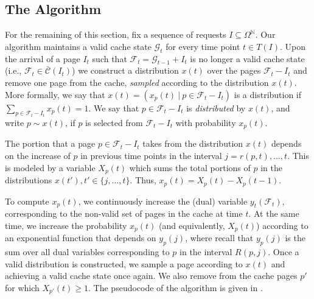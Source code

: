 \documentclass[11pt]{article}
\newcommand{\cG}{{\mathcal{G}}}
\newcommand{\cF}{{\mathcal{F}}}
\newcommand{\cC}{{\mathcal{C}}}
\newcommand{\om}{{\Omega}}
\newcommand{\bbc}{{\bar{\cC}(I_t)}}
\begin{document}
{\subsection{The Algorithm}

For the remaining of this section, fix a sequence of requests $I \subseteq \om^{\mathbb{N}}$. Our algorithm maintains a valid cache state $\cG_t$ for every time point $t \in T(I)$. Upon the arrival of a page $I_t$ such that $\cF_t = \cG_{t-1}+I_t$ is no longer a valid cache state (i.e., $\cF_t \in \bbc$) we construct a distribution $x(t)$ over the pages $\cF_t-I_t$ and remove one page from the cache, {\em sampled} according to the distribution $x(t)$. More formally, we say that $x(t) = \left( x_p(t)~|~p \in \cF_t-I_t\right)$ is a distribution if $\sum_{p \in \cF_t-I_t} x_p(t) = 1$. We say that $p \in \cF_t-I_t$ is {\em distributed} by $x(t)$, and write $p \sim x(t)$, if $p$ is selected from $\cF_t-I_t$ with probability $x_p(t)$. 

The portion that a page $p \in \cF_t-I_t$ takes from the distribution $x(t)$ depends on the increase of $p$ in previous time points in the interval $j = r(p,t),\ldots,t$. This is modeled by a variable $X_p(t)$ which sums the total portions of $p$ in the distributions $x(t'), t' \in \{j,\ldots,t\}$. Thus, $x_p(t) = X_p(t)-X_p(t-1)$.

To compute $x_p(t)$, we continuously increase the (dual) variable $y_t(\cF_t)$, corresponding to the non-valid set of pages in the cache at time $t$. At the same time, we increase the probability $x_p(t)$ (and equivalently, $X_p(t)$) according to an exponential function that depends on $y_p(j)$, where recall that $y_p(j)$ is the sum over all dual variables corresponding to $p$ in the interval $R(p,j)$. Once a valid distribution is constructed, we sample a page according to $x(t)$ and achieving a valid cache state once again. We also remove from the cache pages $p'$ for which $X_{p'}(t) \geq 1$. The pseudocode of the algorithm is given in . 



}
\end{document}
